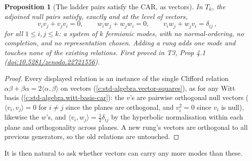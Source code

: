 \documentclass[11pt]{article}
\newtheorem{proposition}[theorem]{Proposition}
\theoremstyle{definition}
\theoremstyle{plain}
\begin{document}
\begin{proposition}[The ladder pairs satisfy the CAR, as vectors]\label{c:tower.ladder-pairs-satisfy-car-vectors}
In $T_k$, the adjoined null pairs satisfy, exactly and at the level of vectors,
\[
v_i v_j + v_j v_i = 0, \qquad w_i w_j + w_j w_i = 0, \qquad v_i w_j + w_j v_i = \delta_{ij}\,,
\]
for all $1 \leq i, j \leq k$: a system of $k$ fermionic modes, with no normal-ordering, no completion, and no representation chosen. Adding a rung adds one mode and touches none of the existing relations.
\emph{First proved in} T3, Prop 4.1 (\href{https://doi.org/10.5281/zenodo.22721556}{doi:10.5281/zenodo.22721556}).
\end{proposition}
\begin{proof}
Every displayed relation is an instance of the single Clifford relation $\alpha\beta + \beta\alpha = 2\langle\alpha, \beta\rangle$ on vectors (\ref{c:std-algebra.vector-squares}), as for any Witt basis (\ref{c:std-algebra.witt-basis-car}): the $v$'s are pairwise orthogonal null vectors ($\langle v_i, v_j \rangle = 0$ for $i \neq j$ since the planes are orthogonal, and $v_i^2 = 0$ since $v_i$ is null), likewise the $w$'s, and $\langle v_i, w_j \rangle = \tfrac12\delta_{ij}$ by the hyperbolic normalisation within each plane and orthogonality across planes. A new rung's vectors are orthogonal to all previous generators, so the old relations are untouched.

\end{proof}

It is then natural to ask whether vectors can carry any more modes than these.
\end{document}
